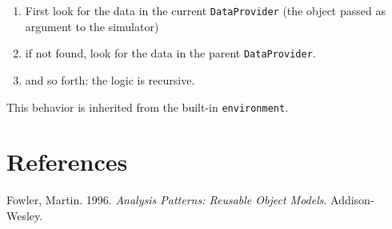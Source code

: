 \documentclass[justified]{tufte-book}
\newlength{\cslhangindent}
\newlength{\cslentryspacingunit} %
\newenvironment{CSLReferences}[2] %
 {%
  \setlength{\parindent}{0pt}
  \ifodd #1
  \let\oldpar\par
  \def\par{\hangindent=\cslhangindent\oldpar}
  \fi
  \setlength{\parskip}{#2\cslentryspacingunit}
 }%
 {}
\newcommand{\class}[1]{\texttt{#1}}
\begin{document}
\begin{enumerate}
\def\labelenumi{\arabic{enumi}.}
\item
  First look for the data in the current \class{DataProvider} (the object passed as
  argument to the simulator)
\item
  if not found, look for the data in the parent \class{DataProvider}.
\item
  and so forth: the logic is recursive.
\end{enumerate}

This behavior is inherited from the built-in \class{environment}.

\hypertarget{references}{%
\chapter{References}\label{references}}

\hypertarget{refs}{}
\begin{CSLReferences}{1}{0}
\leavevmode{}%
Fowler, Martin. 1996. \emph{{Analysis Patterns: Reusable Object Models}}. Addison-Wesley.

\end{CSLReferences}


\printindex
\end{document}
